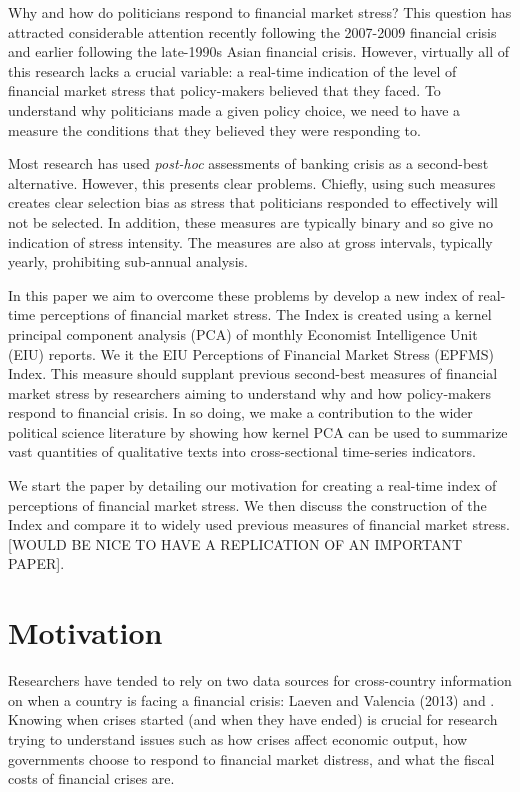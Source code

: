 \documentclass[]{article}
\begin{document}
Why and how do politicians respond to financial market stress? This
question has attracted considerable attention recently following the
2007-2009 financial crisis and earlier following the late-1990s Asian
financial crisis. However, virtually all of this research lacks a
crucial variable: a real-time indication of the level of financial
market stress that policy-makers believed that they faced. To understand
why politicians made a given policy choice, we need to have a measure
the conditions that they believed they were responding to.

Most research has used \emph{post-hoc} assessments of banking crisis as
a second-best alternative. However, this presents clear problems.
Chiefly, using such measures creates clear selection bias as stress that
politicians responded to effectively will not be selected. In addition,
these measures are typically binary and so give no indication of stress
intensity. The measures are also at gross intervals, typically yearly,
prohibiting sub-annual analysis.

In this paper we aim to overcome these problems by develop a new index
of real-time perceptions of financial market stress. The Index is
created using a kernel principal component analysis (PCA) of monthly
Economist Intelligence Unit (EIU) reports. We it the EIU Perceptions of
Financial Market Stress (EPFMS) Index. This measure should supplant
previous second-best measures of financial market stress by researchers
aiming to understand why and how policy-makers respond to financial
crisis. In so doing, we make a contribution to the wider political
science literature by showing how kernel PCA can be used to summarize
vast quantities of qualitative texts into cross-sectional time-series
indicators.

We start the paper by detailing our motivation for creating a real-time
index of perceptions of financial market stress. We then discuss the
construction of the Index and compare it to widely used previous
measures of financial market stress. {[}WOULD BE NICE TO HAVE A
REPLICATION OF AN IMPORTANT PAPER{]}.

\section{Motivation}\label{motivation}

Researchers have tended to rely on two data sources for cross-country
information on when a country is facing a financial crisis: Laeven and
Valencia (2013) and \cite{Reinhart2009}. Knowing when crises
started (and when they have ended) is crucial for research trying to
understand issues such as how crises affect economic output, how
governments choose to respond to financial market distress, and what the
fiscal costs of financial crises are.
\end{document}
